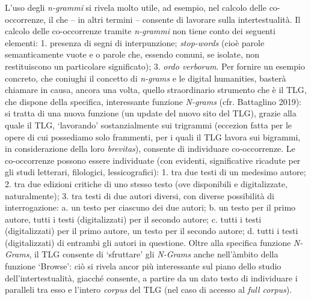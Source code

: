 {L'uso degli \emph{n-grammi} si rivela molto utile, ad esempio, nel
calcolo delle co-occorrenze, il che -- in altri termini -- consente di
lavorare sulla intertestualità. Il calcolo delle co-occorrenze tramite
\emph{n-grammi} non tiene conto dei seguenti elementi: 1. presenza di
segni di interpunzione; \emph{stop-words} (cioè parole semanticamente
vuote e o parole che, essendo comuni, se isolate, non restituiscono un
particolare significato); 3. \emph{ordo verborum}. Per fornire un
esempio concreto, che coniughi il concetto di \emph{n-grams} e le
digital humanities, basterà chiamare in causa, ancora una volta, quello
straordinario strumento che è il TLG, che dispone della specifica,
interessante funzione \emph{N-grams} (cfr. Battaglino 2019): si tratta
di una nuova funzione (un update del nuovo sito del TLG), grazie alla
quale il TLG, `lavorando' sostanzialmente sui trigrammi (eccezion fatta
per le opere di cui possediamo solo frammenti, per i quali il TLG lavora
sui bigrammi, in considerazione della loro \emph{brevitas}), consente di
individuare co-occorrenze. Le co-occorrenze possono essere individuate
(con evidenti, significative ricadute per gli studi letterari,
filologici, lessicografici): 1. tra due testi di un medesimo autore; 2.
tra due edizioni critiche di uno stesso testo (ove disponibili e
digitalizzate, naturalmente); 3. tra testi di due autori diversi, con
diverse possibilità di interrogazione: a. un testo per ciascuno dei due
autori; b. un testo per il primo autore, tutti i testi (digitalizzati)
per il secondo autore; c. tutti i testi (digitalizzati) per il primo
autore, un testo per il secondo autore; d. tutti i testi (digitalizzati)
di entrambi gli autori in questione. Oltre alla specifica funzione
\emph{N-Grams}, il TLG consente di `sfruttare' gli \emph{N-Grams} anche
nell'àmbito della funzione `Browse': ciò si rivela ancor più
interessante sul piano dello studio dell'intertestualità, giacché
consente, a partire da un dato testo di individuare i paralleli tra esso
e l'intero \emph{corpus} del TLG (nel caso di accesso al \emph{full
corpus}).

}
